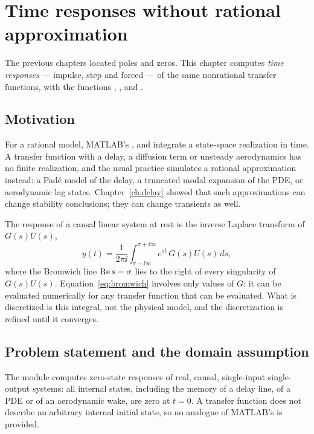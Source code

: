 \chapter[Time responses]{Time responses without rational approximation}\label{ch:response}

The previous chapters located poles and zeros. This chapter computes
\emph{time responses} --- impulse, step and forced --- of the same
nonrational transfer functions, with the functions ,
,  and .

\section{Motivation}

For a rational model, MATLAB's ,  and 
integrate a state-space realization in time. A transfer function with a
delay, a diffusion term or unsteady aerodynamics has no finite realization,
and the usual practice simulates a rational approximation instead: a Padé
model of the delay, a truncated modal expansion of the PDE, or aerodynamic
lag states. Chapter~\ref{ch:delay} showed that such approximations can
change stability conclusions; they can change transients as well.

The response of a causal linear system at rest is the inverse Laplace
transform of $G(s)U(s)$,
\begin{equation}
  y(t)=\frac{1}{2\pi\ii}\int_{\sigma-\ii\infty}^{\sigma+\ii\infty}
        e^{st}\,G(s)U(s)\,ds ,
  \label{eq:bromwich}
\end{equation}
where the Bromwich line $\operatorname{Re} s=\sigma$ lies to the right of every
singularity of $G(s)U(s)$. Equation~\eqref{eq:bromwich} involves only values
of $G$: it can be evaluated numerically for any transfer function that can
be evaluated. What is discretized is this integral, not the physical model,
and the discretization is refined until it converges.

\section{Problem statement and the domain assumption}

The module computes zero-state responses of real, causal, single-input
single-output systems: all internal states, including the memory of a
delay line, of a PDE or of an aerodynamic wake, are zero at $t=0$. A
transfer function does not describe an arbitrary internal initial state,
so no analogue of MATLAB's  is provided.

